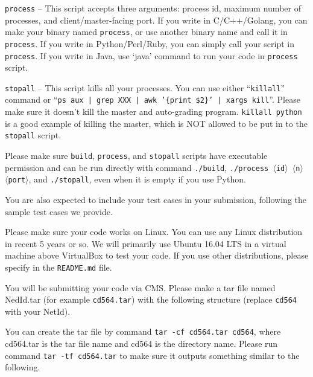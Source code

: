 \documentclass[11pt]{article}
\begin{document}
\begin{compactitem}
\begin{compactitem}
			\item \texttt{process} -- This script accepts three arguments: process id, maximum number of processes, and client/master-facing port. If you write in C/C++/Golang, you can make your binary named \texttt{process}, or use another binary name and call it in \texttt{process}. If	you write in Python/Perl/Ruby, you can simply call your script	in \texttt{process}. If you write in Java, use `java' command to run your code in \texttt{process} script.
            \item \texttt{stopall} -- This script kills all your processes. You can use either ``\texttt{killall}'' command or ``\texttt{ps aux | grep XXX | awk '\{print \$2\}' | xargs kill}''. Please make sure it doesn't kill the master and auto-grading program. \texttt{killall python} is a good example of killing the master, which is NOT allowed to be put in to the \texttt{stopall} script.
            \item Please make sure \texttt{build}, \texttt{process}, and \texttt{stopall} scripts have executable permission and can be run directly with command \texttt{./build}, \texttt{./process	$\langle$id$\rangle$ $\langle$n$\rangle$ $\langle$port$\rangle$}, and \texttt{./stopall}, even when it is empty if you use Python.
		\end{compactitem}
		\item You are also expected to include your test cases in your submission, following the sample test cases we provide.
        \item Please make sure your code works on Linux. You can use any Linux distribution in recent 5 years or so. We will primarily use Ubuntu 16.04 LTS in a virtual machine above VirtualBox to test your code. If you use other distributions, please specify in the \texttt{README.md} file.
	\end{compactitem}
	
	You will be submitting your code via CMS. Please make a tar file named NedId.tar (for example \texttt{cd564.tar}) with the following structure (replace \texttt{cd564} with your NetId).
	
	
	You can create the tar file by command \texttt{tar -cf cd564.tar cd564}, where cd564.tar is the tar file name and cd564 is the directory name.	Please run command \texttt{tar -tf cd564.tar} to make sure it outputs something similar to the following.
	
\end{document}
